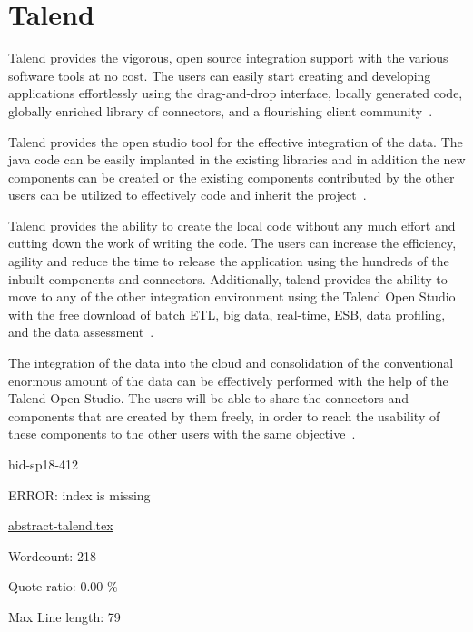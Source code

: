 \section{Talend}
Talend provides the vigorous, open source integration support with the various
software tools at no cost. The users can easily start creating and developing
applications effortlessly using the drag-and-drop interface, locally generated
code, globally enriched library of connectors, and a flourishing client
community~\cite{hid-sp18-412-talend_products}.

Talend provides the open studio tool for the effective integration of the data.
 The java code can be easily implanted in the existing libraries and in
addition the new components can be created or the existing components
contributed by the other users can be utilized to effectively code and
inherit the project~\cite{hid-sp18-412-talend_open_studio}.

Talend provides the ability to create the local code without any much effort
and cutting down the work of writing the code.
The users can increase the efficiency, agility and
reduce the time to release the application using the hundreds of the
inbuilt components and connectors. Additionally, talend provides the
ability to move to any of the other integration environment using the
Talend Open Studio with the free download of batch ETL, big data, real-time,
ESB, data profiling, and
the data assessment~\cite{hid-sp18-412-talend_products}.

The integration of the data into the cloud and consolidation of the
conventional enormous amount of the data can be effectively performed
with the help of the Talend Open Studio. The users will be able to share
the connectors and components that are created by them freely,
in order to reach the usability of these components to the
other users with the same objective~\cite{hid-sp18-412-talend_products}.




\begin{IU}

hid-sp18-412

ERROR: index is missing

\href{https://github.com/cloudmesh-community/hid-sp18-412/blob/master//technology/abstract-talend.tex}{abstract-talend.tex}

 

Wordcount: 218


Quote ratio: 0.00 \%
 
Max Line length: 79
\end{IU}


